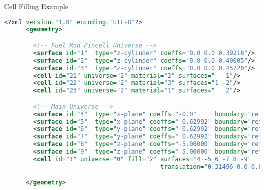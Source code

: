 
\begin{frame}[fragile]{Cell Filling Example}

  \begin{scriptsize}
    \begin{lstlisting}[language=XML,gobble=4]
      <?xml version="1.0" encoding="UTF-8"?>
      <geometry>

        <!-- Fuel Rod Pincell Universe -->
        <surface id="1"  type="z-cylinder" coeffs="0.0 0.0 0.39218"/>     <!-- fuel OR   -->
        <surface id="2"  type="z-cylinder" coeffs="0.0 0.0 0.40005"/>     <!-- gap OR    -->
        <surface id="3"  type="z-cylinder" coeffs="0.0 0.0 0.45720"/>     <!-- clad OR   -->
        <cell id="21" universe="2" material="2" surfaces="  -1"/>         <!-- fuel  -->
        <cell id="22" universe="2" material="3" surfaces="1 -2"/>         <!-- clad  -->
        <cell id="23" universe="2" material="1" surfaces="   2"/>         <!-- water -->

        <!-- Main Universe -->
        <surface id="4"  type="x-plane" coeffs="-0.0"     boundary="reflective"/>
        <surface id="5"  type="x-plane" coeffs=" 0.62992" boundary="reflective"/>
        <surface id="6"  type="y-plane" coeffs="-0.62992" boundary="reflective"/>
        <surface id="7"  type="y-plane" coeffs=" 0.62992" boundary="reflective"/>
        <surface id="8"  type="z-plane" coeffs="-5.00000" boundary="reflective"/>
        <surface id="9"  type="z-plane" coeffs=" 5.00000" boundary="reflective"/>
        <cell id="1" universe="0" fill="2" surfaces="4 -5 6 -7 8 -9"
                                           translation="0.31496 0.0 0.0" />

      </geometry>
    \end{lstlisting}
  \end{scriptsize}

  \centering

\end{frame}

